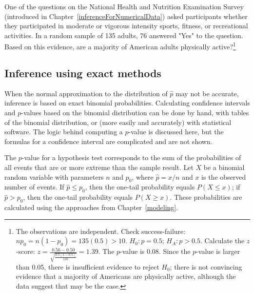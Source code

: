 \begin{exercise} One of the questions on the National Health and Nutrition Examination Survey (introduced in Chapter~\ref{inferenceForNumericalData}) asked participants whether they participated in moderate or vigorous intensity sports, fitness, or recreational activities. In a random sample of 135 adults, 76 answered "Yes" to the question. Based on this evidence, are a majority of American adults physically active?\footnote{The observations are independent. Check success-failure: $np_0 = n(1-p_0) = 135(0.5) > 10$. $H_0: p = 0.5$; $H_A: p > 0.5$. Calculate the $z$-score: $z = \frac{0.56 - 0.50}{\sqrt{\frac{0.5(1-0.5)}{135}}} = 1.39$. The $p$-value is 0.08. Since the $p$-value is larger than 0.05, there is insufficient evidence to reject $H_0$; there is not convincing evidence that a majority of Americans are physically active, although the data suggest that may be the case.}
\end{exercise}


\subsection{Inference using exact methods}

When the normal approximation to the distribution of $\hat{p}$ may not be accurate, inference is based on exact binomial probabilities. Calculating confidence intervals and $p$-values based on the binomial distribution can be done by hand, with tables of the binomial distribution, or (more easily and accurately) with statistical software. The logic behind computing a $p$-value is discussed here, but the formulas for a confidence interval are complicated and are not shown.

The $p$-value for a hypothesis test corresponds to the sum of the probabilities of all events that are or more extreme than the sample result. Let $X$ be a binomial random variable with parameters $n$ and $p_0$, where $\hat{p} = x/n$ and $x$ is the observed number of events. If $\hat{p} \leq p_0$, then the one-tail probability equals $P(X \leq x)$; if $\hat{p} > p_0$, then the one-tail probability equals $P(X \geq x)$. These probabilities are calculated using the approaches from Chapter~\ref{modeling}.

